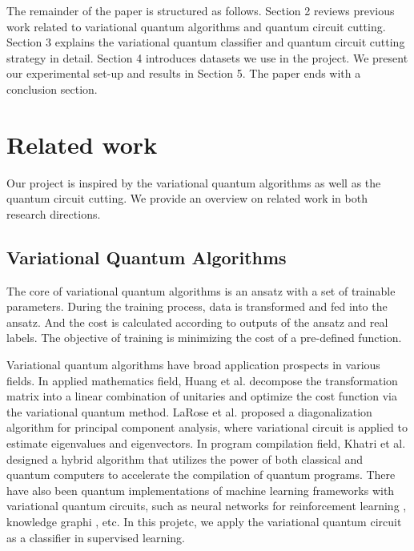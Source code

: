 \documentclass[sigconf]{acmart}
\begin{document}
The remainder of the paper is structured as follows. Section 2 reviews previous work related to variational quantum algorithms and quantum circuit cutting. Section 3 explains the variational quantum classifier and quantum circuit cutting strategy in detail. Section 4 introduces datasets we use in the project. We present our experimental set-up and results in Section 5. The paper ends with a conclusion section.

\section{Related work}

Our project is inspired by the variational quantum algorithms as well as the quantum circuit cutting. We provide an overview on related work in both research directions.

\subsection{Variational Quantum Algorithms}
The core of variational quantum algorithms is an ansatz with a set of trainable parameters. During the training process, data is transformed and fed into the ansatz. And the cost is calculated according to outputs of the ansatz and real labels. The objective of training is minimizing the cost of a pre-defined function.

Variational quantum algorithms have broad application prospects in various fields. In applied mathematics field, Huang et al. \cite{vqa-huang} decompose the transformation matrix into a linear combination of unitaries and optimize the cost function via the variational quantum method. LaRose et al. \cite{vqa-larose} proposed a diagonalization algorithm for principal component analysis, where variational circuit is applied to estimate eigenvalues and eigenvectors. In program compilation field, Khatri et al. \cite{vqa-qc} designed a hybrid algorithm that utilizes the power of both classical and quantum computers to accelerate the compilation of quantum programs. There have also been quantum implementations of machine learning frameworks with variational quantum circuits, such as neural networks for reinforcement learning \cite{vqa-rl}, knowledge graphi \cite{vqa-kg}, etc. In this projetc, we apply the variational quantum circuit as a classifier in supervised learning.
\end{document}
